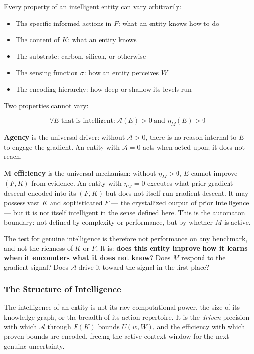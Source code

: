 \documentclass[
]{article}
\providecommand{\tightlist}{%
  \setlength{\itemsep}{0pt}\setlength{\parskip}{0pt}}
\begin{document}
Every property of an intelligent entity can vary arbitrarily:

\begin{itemize}
\tightlist
\item
  The specific informed actions in \(F\): what an entity knows how to do
\item
  The content of \(K\): what an entity knows
\item
  The substrate: carbon, silicon, or otherwise
\item
  The sensing function \(\sigma\): how an entity perceives \(W\)
\item
  The encoding hierarchy: how deep or shallow its levels run
\end{itemize}

Two properties cannot vary:

\[\forall E \text{ that is intelligent}: \mathcal{A}(E) > 0 \text{ and } \eta_M(E) > 0\]

\textbf{Agency} is the universal driver: without \(\mathcal{A} > 0\),
there is no reason internal to \(E\) to engage the gradient. An entity
with \(\mathcal{A} = 0\) acts when acted upon; it does not reach.

\textbf{M efficiency} is the universal mechanism: without
\(\eta_M > 0\), \(E\) cannot improve \((F, K)\) from evidence. An entity
with \(\eta_M = 0\) executes what prior gradient descent encoded into
its \((F, K)\) but does not itself run gradient descent. It may possess
vast \(K\) and sophisticated \(F\) --- the crystallized output of prior
intelligence --- but it is not itself intelligent in the sense defined
here. This is the automaton boundary: not defined by complexity or
performance, but by whether \(M\) is active.

The test for genuine intelligence is therefore not performance on any
benchmark, and not the richness of \(K\) or \(F\). It is: \textbf{does
this entity improve how it learns when it encounters what it does not
know?} Does \(M\) respond to the gradient signal? Does \(\mathcal{A}\)
drive it toward the signal in the first place?

\subsubsection{The Structure of
Intelligence}\label{the-structure-of-intelligence}

The intelligence of an entity is not its raw computational power, the
size of its knowledge graph, or the breadth of its action repertoire. It
is the \emph{driven} precision with which \(\mathcal{A}\) through
\(F(K)\) bounds \(U(w, W)\), and the efficiency with which proven bounds
are encoded, freeing the active context window for the next genuine
uncertainty.
\end{document}
